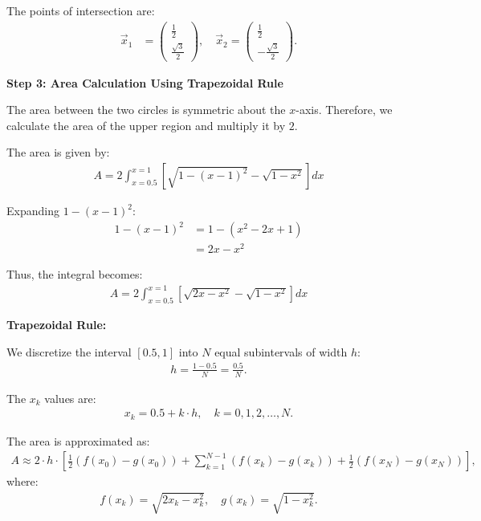 \documentclass[journal]{IEEEtran}
\begin{document}
The points of intersection are:
\begin{align}
    \vec{x}_1 &= \begin{pmatrix} \frac{1}{2} \\ \frac{\sqrt{3}}{2} \end{pmatrix}, \quad
    \vec{x}_2 = \begin{pmatrix} \frac{1}{2} \\ -\frac{\sqrt{3}}{2} \end{pmatrix}.
\end{align}


\textbf{Step 3: Area Calculation Using Trapezoidal Rule}

The area between the two circles is symmetric about the $x$-axis. Therefore, we calculate the area of the upper region and multiply it by $2$.


The area is given by:
\begin{align}
    A = 2 \int_{x=0.5}^{x=1} \left[ \sqrt{1 - (x - 1)^2} - \sqrt{1 - x^2} \right] dx
\end{align}

Expanding $1 - (x - 1)^2$:
\begin{align}
    1 - (x - 1)^2 &= 1 - (x^2 - 2x + 1) \\
    &= 2x - x^2
\end{align}

Thus, the integral becomes:
\begin{align}
    A = 2 \int_{x=0.5}^{x=1} \left[ \sqrt{2x - x^2} - \sqrt{1 - x^2} \right] dx
\end{align}

\textbf{Trapezoidal Rule:}

We discretize the interval $[0.5, 1]$ into $N$ equal subintervals of width $h$:
\begin{align}
    h = \frac{1 - 0.5}{N} = \frac{0.5}{N}.
\end{align}

The $x_k$ values are:
\begin{align}
    x_k = 0.5 + k \cdot h, \quad k = 0, 1, 2, \dots, N.
\end{align}

The area is approximated as:
\begin{align}
    A \approx 2 \cdot h \cdot \left[ \frac{1}{2}(f(x_0) - g(x_0)) + \sum_{k=1}^{N-1} (f(x_k) - g(x_k)) + \frac{1}{2}(f(x_N) - g(x_N)) \right],
\end{align}
where:
\begin{align}
    f(x_k) = \sqrt{2x_k - x_k^2}, \quad g(x_k) = \sqrt{1 - x_k^2}.
\end{align}
\end{document}
